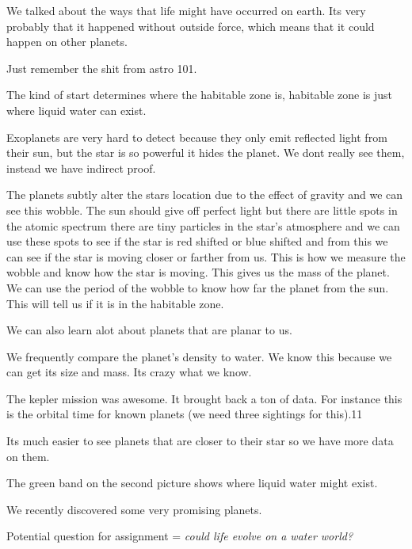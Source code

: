 \documentclass{article}
\begin{document}

We talked about the ways that life might have occurred on earth. Its very probably that it happened without outside force, which means that it could happen on other planets.


Just remember the shit from astro 101.


The kind of start determines where the habitable zone is, habitable zone is just where liquid water can exist.


Exoplanets are very hard to detect because they only emit reflected light from their sun, but the star is so powerful it hides the planet. We dont really see them, instead we have indirect proof.

The planets subtly alter the stars location due to the effect of gravity and we can see this wobble. The sun should give off perfect light but there are little spots in the atomic spectrum there are tiny particles in the star's atmosphere and we can use these spots to see if the star is red shifted or blue shifted and from this we can see if the star is moving closer or farther from us. This is how we measure the wobble and know how the star is moving. This gives us the mass of the planet. We can use the period of the wobble to know how far the planet from the sun. This will tell us if it is in the habitable zone.


We can also learn alot about planets that are planar to us.



We frequently compare the planet's density to water. We know this because we can get its size and mass. Its crazy what we know.


The kepler mission was awesome. It brought back a ton of data. For instance this is the orbital time for known planets (we need three sightings for this).11


Its much easier to see planets that are closer to their star so we have more data on them.

The green band on the second picture shows where liquid water might exist.



We recently discovered some very promising planets.


Potential question for assignment = \emph{could life evolve on a water world?}
\end{document}
